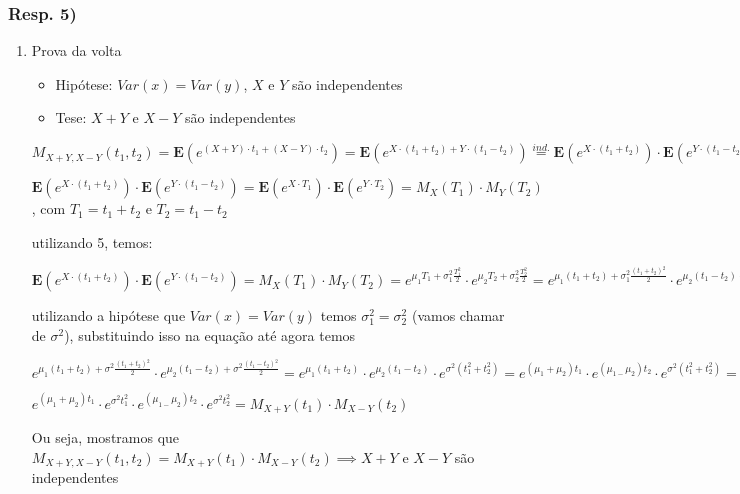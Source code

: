 \documentclass[portuguese]{article}
\begin{document}
\subsubsection*{\textmd{Resp. 5) }}
\begin{enumerate}
\item Prova da volta

\begin{itemize}
\item Hipótese: $Var(x)=Var(y)$, $X$ e $Y$ são independentes
\item Tese: $X+Y$ e $X-Y$ são independentes
\end{itemize}

$M_{X+Y,X-Y}(t_{1},t_{2})=\mathbf{E}(e^{(X+Y)\cdot t_{1}+(X-Y)\cdot t_{2}})=\mathbf{E}(e^{X\cdot(t_{1}+t_{2})+Y\cdot(t_{1}-t_{2})})\overset{ind.}{=}\mathbf{E}(e^{X\cdot(t_{1}+t_{2})})\cdot\mathbf{E}(e^{Y\cdot(t_{1}-t_{2})})$


$\mathbf{E}(e^{X\cdot(t_{1}+t_{2})})\cdot\mathbf{E}(e^{Y\cdot(t_{1}-t_{2})})=\mathbf{E}(e^{X\cdot T_{1}})\cdot\mathbf{E}(e^{Y\cdot T_{2}})=M_{X}(T_{1})\cdot M_{Y}(T_{2})$,
com $T_{1}=t_{1}+t_{2}$ e $T_{2}=t_{1}-t_{2}$


utilizando 5, temos:


$\mathbf{E}(e^{X\cdot(t_{1}+t_{2})})\cdot\mathbf{E}(e^{Y\cdot(t_{1}-t_{2})})=M_{X}(T_{1})\cdot M_{Y}(T_{2})=e^{\mu_{1}T_{1}+\sigma_{1}^{2}\frac{T_{1}^{2}}{2}}\cdot e^{\mu_{2}T_{2}+\sigma_{2}^{2}\frac{T_{2}^{2}}{2}}=e^{\mu_{1}(t_{1}+t_{2})+\sigma_{1}^{2}\frac{(t_{1}+t_{2}){}^{2}}{2}}\cdot e^{\mu_{2}(t_{1}-t_{2})+\sigma_{2}^{2}\frac{(t_{1}-t_{2}){}^{2}}{2}}$


utilizando a hipótese que $Var(x)=Var(y)$ temos $\sigma_{1}^{2}=\sigma_{2}^{2}$
(vamos chamar de $\sigma^{2}$), substituindo isso na equação até
agora temos


$e^{\mu_{1}(t_{1}+t_{2})+\sigma^{2}\frac{(t_{1}+t_{2}){}^{2}}{2}}\cdot e^{\mu_{2}(t_{1}-t_{2})+\sigma^{2}\frac{(t_{1}-t_{2}){}^{2}}{2}}=e^{\mu_{1}(t_{1}+t_{2})}\cdot e^{\mu_{2}(t_{1}-t_{2})}\cdot e^{\sigma^{2}(t_{1}^{2}+t_{2}^{2})}=e^{(\mu_{1}+\mu_{2})t_{1}}\cdot e^{(\mu_{1-}\mu_{2})t_{2}}\cdot e^{\sigma^{2}(t_{1}^{2}+t_{2}^{2})}=$


$e^{(\mu_{1}+\mu_{2})t_{1}}\cdot e^{\sigma^{2}t_{1}^{2}}\cdot e^{(\mu_{1-}\mu_{2})t_{2}}\cdot e^{\sigma^{2}t_{2}^{2}}=M_{X+Y}(t_{1})\cdot M_{X-Y}(t_{2})$


Ou seja, mostramos que $M_{X+Y,X-Y}(t_{1},t_{2})=M_{X+Y}(t_{1})\cdot M_{X-Y}(t_{2})\implies$$X+Y$
e $X-Y$ são independentes


\end{enumerate}
\end{document}
